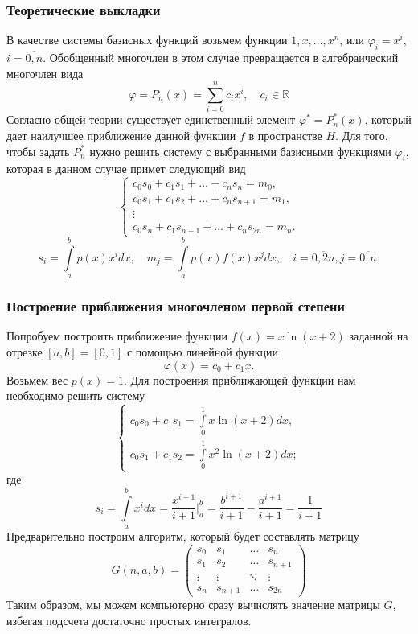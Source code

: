 \documentclass[11pt]{article}
\begin{document}
\subsubsection*{Теоретические
выкладки}\label{ux442ux435ux43eux440ux435ux442ux438ux447ux435ux441ux43aux438ux435-ux432ux44bux43aux43bux430ux434ux43aux438}

В качестве системы базисных функций возьмем функции
\(1, x, \ldots, x^n\), или \(\varphi_i = x^i\), \(i=\overline{0,n}\).
Обобщенный многочлен в этом случае превращается в алгебраический
многочлен вида
\[\varphi = P_n(x) = \sum_{i=0}^{n}c_ix^i,\quad c_i \in\mathbb{R}\]
Согласно общей теории существует единственный элемент
\(\varphi^* = P_n^*(x)\), который дает наилучшее приближение данной
функции \(f\) в пространстве \(H\). Для того, чтобы задать \(P_n^*\)
нужно решить систему с выбранными базисными функциями \(\varphi_i\),
которая в данном случае примет следующий вид \[\begin{cases}
    c_0s_0 + c_1s_1 + \ldots + c_ns_n = m_0,\\
    c_0s_1 + c_1s_2 + \ldots + c_ns_{n+1} = m_1,\\
    \vdots\\
    c_0s_n + c_1s_{n+1} + \ldots + c_ns_{2n} = m_n.
 \end{cases}\]
\[s_i = \int\limits_a^b p(x) x^i dx,\quad m_j= \int\limits_a^b p(x) f(x) x^j dx,\quad i=\overline{0,2n}, j=\overline{0,n}.\]

\subsubsection*{Построение приближения многочленом первой степени}
Попробуем построить приближение функции \(f(x) = x\ln (x+2)\) заданной на отрезке
\([a,b]=[0, 1]\) с помощью линейной функции \[\varphi(x) = c_0 + c_1x.\]
Возьмем вес \(p(x) = 1\). Для построения приближающей функции нам
необходимо решить систему \[\begin{cases}
c_0 s_0 + c_1 s_1 = \int\limits_{0}^1 x\ln (x+2) dx,\\
c_0 s_1 + c_1 s_2 = \int\limits_{0}^1 x^2\ln (x+2) dx;
\end{cases}\] где
\[s_i = \int\limits_a^b x^idx = \dfrac{x^{i+1}}{i+1}\Big|_a^b =\dfrac{b^{i+1}}{i+1} -\dfrac{a^{i+1}}{i+1} = \dfrac{1}{i+1}\]
Предварительно построим алгоритм, который будет составлять матрицу
\[G(n, a,b) = \begin{pmatrix}s_0 & s_1 & \dots & s_n\\ s_1 & s_2 & \dots & s_{n+1} \\ \vdots & \vdots & \ddots & \vdots \\ s_n & s_{n+1} & \dots & s_{2n}\end{pmatrix}\]
Таким образом, мы можем компьютерно сразу вычислять значение матрицы
\(G\), избегая подсчета достаточно простых интегралов.
\end{document}
